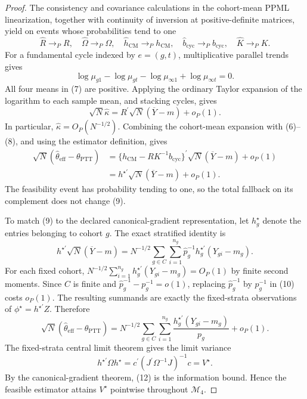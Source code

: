 \documentclass{article}
\begin{document}
\begin{proof}
The consistency and covariance calculations in the cohort-mean PPML linearization, together with continuity of inversion at positive-definite matrices, yield on events whose probabilities tend to one
\[
\widehat R\to_PR,
\quad \widehat\Omega\to_P\Omega,
\quad \widehat h_{\mathrm{CM}}\to_Ph_{\mathrm{CM}},
\quad \widehat b_{\mathrm{cyc}}\to_Pb_{\mathrm{cyc}},
\quad \widehat K\to_PK.                                                 \tag{6}
\]
For a fundamental cycle indexed by \(e=(g,t)\), multiplicative parallel trends gives
\[
\log\mu_{g1}-\log\mu_{gt}-\log\mu_{\infty1}+\log\mu_{\infty t}=0.  \tag{7}
\]
All four means in (7) are positive.  Applying the ordinary Taylor expansion of the logarithm to each sample mean, and stacking cycles, gives
\[
\sqrt N\widehat\kappa
=R^{\prime}\sqrt N(\overline Y-m)+o_P(1).                              \tag{8}
\]
In particular, \(\widehat\kappa=O_P(N^{-1/2})\).  Combining the cohort-mean expansion with (6)--(8), and using the estimator definition, gives
\[
\begin{aligned}
\sqrt N(\widehat\theta_{\mathrm{eff}}-\theta_{\mathrm{PTT}})
&=\{h_{\mathrm{CM}}-RK^{-1}b_{\mathrm{cyc}}\}^{\prime}
  \sqrt N(\overline Y-m)+o_P(1)\\
&=h^{\star\prime}\sqrt N(\overline Y-m)+o_P(1).                       \tag{9}
\end{aligned}
\]
The feasibility event has probability tending to one, so the total fallback on its complement does not change (9).

To match (9) to the declared canonical-gradient representation, let \(h_g^{\star}\) denote the entries belonging to cohort \(g\).  The exact stratified identity is
\[
h^{\star\prime}\sqrt N(\overline Y-m)
=N^{-1/2}\sum_{g\in C}\sum_{i=1}^{n_g}
 \widehat p_g^{-1}h_g^{\star\prime}(Y_{gi}-m_g).                       \tag{10}
\]
For each fixed cohort,
\(N^{-1/2}\sum_{i=1}^{n_g}h_g^{\star\prime}(Y_{gi}-m_g)=O_P(1)\) by finite second moments.  Since \(C\) is finite and
\(\widehat p_g^{-1}-p_g^{-1}=o(1)\), replacing \(\widehat p_g^{-1}\) by \(p_g^{-1}\) in (10) costs \(o_P(1)\).  The resulting summands are exactly the fixed-strata observations of \(\phi^{\star}=h^{\star\prime}Z\).  Therefore
\[
\sqrt N(\widehat\theta_{\mathrm{eff}}-\theta_{\mathrm{PTT}})
=N^{-1/2}\sum_{g\in C}\sum_{i=1}^{n_g}
 \frac{h_g^{\star\prime}(Y_{gi}-m_g)}{p_g}+o_P(1).                    \tag{11}
\]
The fixed-strata central limit theorem gives the limit variance
\[
h^{\star\prime}\Omega h^{\star}
=c^{\prime}(J^{\prime}\Omega^{-1}J)^{-1}c
=V^{\star}.                                                            \tag{12}
\]
By the canonical-gradient theorem, (12) is the information bound.  Hence the feasible estimator attains \(V^{\star}\) pointwise throughout \(\mathcal M_4\).
\end{proof}
\end{document}
